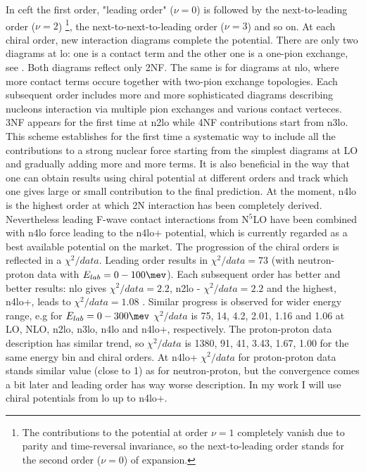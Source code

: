 In \gls{ceft} the first order, "leading order" ($\nu=0$) is followed 
by the next-to-leading order ($\nu=2$)
\footnote{The contributions to the potential at order $\nu=1$ completely vanish due to parity and time-reversal invariance,
so the next-to-leading order stands for the second order ($\nu=0$) of expansion.},
 the next-to-next-to-leading order ($\nu=3$) and so on.
 At each chiral order, new interaction diagrams complete the potential.
 There are only two diagrams at \gls{lo}: one is a contact term
 and the other one
 is a one-pion exchange, see . Both diagrams reflect only 2NF.
 The same is for diagrams at \gls{nlo}, where more contact terms occure together with two-pion 
 exchange topologies. Each subsequent order includes more and more sophisticated diagrams
 describing nucleons interaction
 via multiple  pion exchanges and various contact verteces.
 3NF appears for the first time at \gls{n2lo}
 while 4NF contributions start from \gls{n3lo}.
 This scheme establishes for the first time a systematic
way to include all the contributions to a strong nuclear force
 starting from the simplest diagrams at LO and gradually
adding more and more terms. 
It is also beneficial in the way that 
one can obtain results using chiral potential at different
orders and track which one gives large or small contribution to the final prediction.
At the moment, \gls{n4lo} is the highest order at which 2N interaction has been completely derived.
Nevertheless leading F-wave contact interactions from N$^5$LO have been combined with \gls{n4lo} force
leading to the \gls{n4lo+} potential,
which is currently regarded as a best available potential on the market.
The progression of the chiral orders is reflected in a $\chi^2/data$.
Leading order results in $\chi^2/data = 73$ (with neutron-proton data with $E_{lab} = 0-100 \unit{\mev}$).
Each subsequent order has better and better results: \gls{nlo} gives $\chi^2/data = 2.2$, \gls{n2lo} - $\chi^2/data = 2.2$
and the highest, \gls{n4lo+}, leads to $\chi^2/data = 1.08$ \cite{reinkrebs2018}.
Similar progress is observed for wider energy range, e.g for $E_{lab} = 0-300 \unit{\mev}$
$\chi^2/data$ is 75, 14, 4.2, 2.01, 1.16 and 1.06
at LO, NLO, \gls{n2lo}, \gls{n3lo}, \gls{n4lo} and \gls{n4lo+}, respectively.
The proton-proton data description has similar trend, so $\chi^2/data$ is 1380, 91, 41, 3.43, 1.67, 1.00 
for the same energy bin and chiral orders. At \gls{n4lo+} $\chi^2/data$ for proton-proton data
stands similar value (close to 1) as for neutron-proton, but the convergence comes a bit later and 
leading order has way worse description.
In my work I will use chiral potentials from \gls{lo} up to \gls{n4lo+}.

